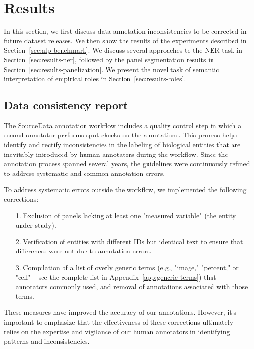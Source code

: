 \documentclass{bioinfo}
\begin{document}
\begin{methods}
\end{methods}

\section{Results}

In this section, we first discuss data annotation inconsistencies to be corrected in future dataset releases. We then show the results of the experiments described in Section~\ref{sec:nlp-benchmark}. We discuss several approaches to the NER task in Section~\ref{sec:results-ner}, followed by the panel segmentation results in Section~\ref{sec:results-panelization}. We present the novel task of semantic interpretation of empirical roles in Section~\ref{sec:results-roles}.

\subsection{Data consistency report}\label{sec:data-consistency}

The SourceData annotation workflow includes a quality control step in which a second annotator performs spot checks on the annotations. This process helps identify and rectify inconsistencies in the labeling of biological entities that are inevitably introduced by human annotators during the workflow. Since the annotation process spanned several years, the guidelines were continuously refined to address systematic and common annotation errors.

To address systematic errors outside the workflow, we implemented the following corrections:
\begin{itemize}
    \item[1.] Exclusion of panels lacking at least one "measured variable" (the entity under study).
    \item[2.] Verification of entities with different IDs but identical text to ensure that differences were not due to annotation errors.
    \item[3.] Compilation of a list of overly generic terms (e.g., "image," "percent," or "cell" – see the complete list in Appendix~\ref{app:generic-terms}) that annotators commonly used, and removal of annotations associated with those terms.
\end{itemize}

These measures have improved the accuracy of our annotations. However, it's important to emphasize that the effectiveness of these corrections ultimately relies on the expertise and vigilance of our human annotators in identifying patterns and inconsistencies.
 
\end{document}
